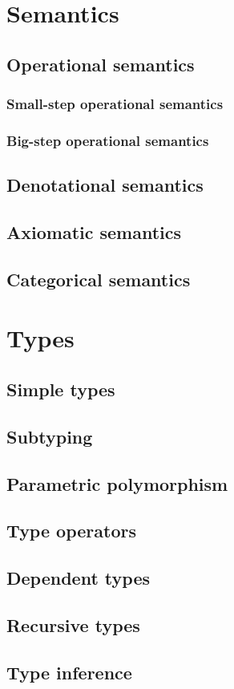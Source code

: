 \documentclass[oneside]{book}
\begin{document}
  \part{Semantics}

    \chapter{Operational semantics}

      \section{Small-step operational semantics}

      \section{Big-step operational semantics}

    \chapter{Denotational semantics}

    \chapter{Axiomatic semantics}

    \chapter{Categorical semantics}

  \part{Types}

    \chapter{Simple types}

    \chapter{Subtyping}

    \chapter{Parametric polymorphism}

    \chapter{Type operators}

    \chapter{Dependent types}

    \chapter{Recursive types}

    \chapter{Type inference}

  \backmatter

  \printbibliography

  \printindex
\end{document}
